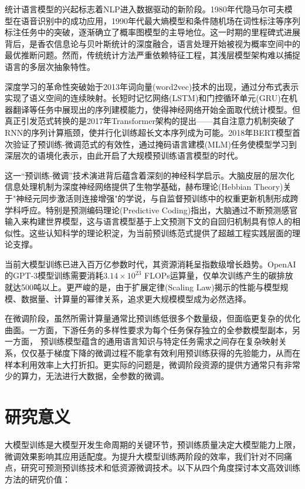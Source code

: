 统计语言模型的兴起标志着NLP进入数据驱动的新阶段。1980年代隐马尔可夫模型在语音识别中的成功应用，1990年代最大熵模型和条件随机场在词性标注等序列标注任务中的突破，逐渐确立了概率图模型的主导地位。这一时期的里程碑式进展背后，是香农信息论与贝叶斯统计的深度融合，语言处理开始被视为概率空间中的最优推断问题。然而，传统统计方法严重依赖特征工程，其浅层模型架构难以捕捉语言的多层次抽象特性。

深度学习的革命性突破始于2013年词向量(word2vec)技术的出现，通过分布式表示实现了语义空间的连续映射。长短时记忆网络(LSTM)和门控循环单元(GRU)在机器翻译等任务中展现出的序列建模能力，使得神经网络开始全面取代统计模型。但真正引发范式转换的是2017年Transformer架构的提出——其自注意力机制突破了RNN的序列计算瓶颈，使并行化训练超长文本序列成为可能。2018年BERT模型首次验证了预训练-微调范式的有效性，通过掩码语言建模(MLM)任务使模型学习到深层次的语境化表示，由此开启了大规模预训练语言模型的时代。

这一“预训练-微调”技术演进背后蕴含着深刻的神经科学启示。大脑皮层的层次化信息处理机制为深度神经网络提供了生物学基础，赫布理论(Hebbian Theory)关于"神经元同步激活则连接增强"的学说，与自监督预训练中的权重更新机制形成跨学科呼应。特别是预测编码理论(Predictive Coding)指出，大脑通过不断预测感官输入来构建世界模型，这与语言模型基于上文预测下文的自回归机制具有惊人的相似性。这些认知科学的理论积淀，为当前预训练范式提供了超越工程实践层面的理论支撑。

当前大模型训练已进入百万亿参数时代，其资源消耗呈指数级增长趋势。OpenAI的GPT-3模型训练需要消耗$3.14\times 10^{23}$ FLOPs运算量，仅单次训练产生的碳排放就达500吨以上。更严峻的是，由于扩展定律(Scaling Law)揭示的性能与模型规模、数据量、计算量的幂律关系，追求更大规模模型成为必然选择。

在微调阶段，虽然所需计算量通常比预训练低很多个数量级，但面临更复杂的优化曲面。一方面，下游任务的多样性要求为每个任务保存独立的全参数模型副本，另一方面， 预训练模型蕴含的通用语言知识与特定任务需求之间存在复杂映射关系，仅仅基于梯度下降的微调过程不能拿有效利用预训练获得的先验能力，从而在样本利用效率上大打折扣。更实际的问题是，微调阶段资源的提供方通常只有非常少的算力，无法进行大数据，全参数的微调。



\section{研究意义}
大模型训练是大模型开发生命周期的关键环节，预训练质量决定大模型能力上限，微调效果影响其应用适配度。为提升大模型训练两阶段的效率，我们针对不同痛点，研究可预测预训练技术和低资源微调技术。以下从四个角度探讨本文高效训练方法的研究价值：


